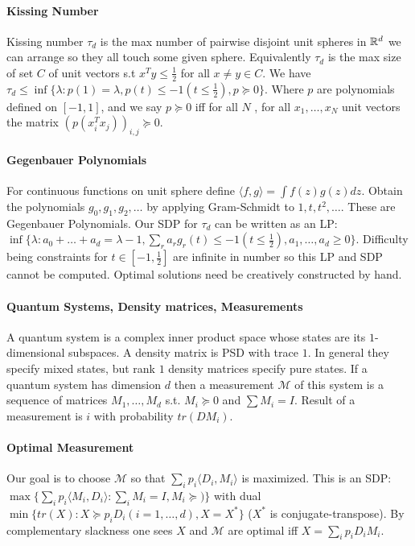 \documentclass[letterpaper,11pt,oneside,onecolumn]{article}
\newcommand{\cM}{\mathcal{M}} \newcommand{\cN}{\mathcal{N}}
\begin{document}
\paragraph{Kissing Number} Kissing number $\tau_d$ is the max number of pairwise disjoint unit spheres in $\mathbb{R}^d$ we can arrange so they all touch some given sphere. Equivalently $\tau_d$ is the max size of set $C$ of unit vectors s.t $x^Ty\leq \frac{1}{2}$ for all $x\neq y \in C$. We have $\tau_d \leq \inf \{\lambda: p(1) = \lambda, p(t) \leq -1 (t \leq \frac{1}{2}), p \succcurlyeq 0\}$. Where $p$ are polynomials defined on $[-1,1]$, and we say $p\succcurlyeq 0$ iff for all $N$ , for all $x_1,\dots, x_N$ unit vectors the matrix $(p(x_i^Tx_j))_{i,j} \succcurlyeq 0$.
\paragraph{Gegenbauer Polynomials} For continuous functions on unit sphere define $\langle f, g\rangle = \int f(z)g(z) dz$. Obtain the polynomials $g_0, g_1, g_2,\dots$ by applying Gram-Schmidt to $1,t,t^2,\dots$. These are Gegenbauer Polynomials. Our SDP for $\tau_d$ can be written as an LP: $\inf\{\lambda: a_0 + \dots + a_d = \lambda - 1, \sum_r a_r g_r(t) \leq -1 (t\leq \frac{1}{2}), a_1, \dots, a_d \geq 0\}$. Difficulty being constraints for $t\in [-1,\frac{1}{2}]$ are infinite in number so this LP and SDP cannot be computed. Optimal solutions need be creatively constructed by hand.
\paragraph{Quantum Systems, Density matrices, Measurements}A quantum system is a complex inner product space whose states are its $1$-dimensional subspaces. A density matrix is PSD with trace $1$. In general they specify mixed states, but rank $1$ density matrices specify pure states. If a quantum system has dimension $d$ then a measurement $\cM$ of this system is a sequence of matrices $M_1, \dots, M_d$ s.t. $M_i \succcurlyeq 0$ and $\sum M_i = I$. Result of a measurement is $i$ with probability $tr(DM_i)$.
\paragraph{Optimal Measurement}
Our goal is to choose $\cM$ so that $\sum_i p_i \langle D_i, M_i \rangle$ is maximized. This is an SDP: $\max \{\sum_i p_i\langle M_i, D_i \rangle : \sum_i M_i = I, M_i \succcurlyeq )\}$ with dual $\min\{tr(X) : X \succcurlyeq p_iD_i (i =1, \dots, d), X = X^*\}$ ($X^*$ is conjugate-transpose). By complementary slackness one sees $X$ and $\cM$ are optimal iff $X=\sum_i p_iD_iM_i$.
\end{document}
